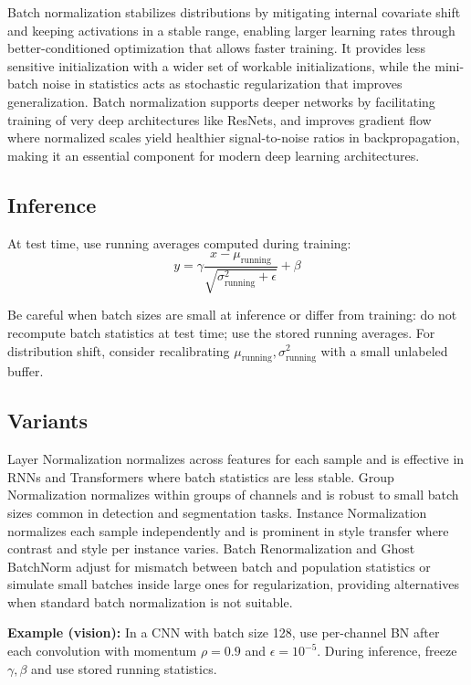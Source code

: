 Batch normalization stabilizes distributions by mitigating internal covariate shift and keeping activations in a stable range, enabling larger learning rates through better-conditioned optimization that allows faster training. It provides less sensitive initialization with a wider set of workable initializations, while the mini-batch noise in statistics acts as stochastic regularization that improves generalization. Batch normalization supports deeper networks by facilitating training of very deep architectures like ResNets, and improves gradient flow where normalized scales yield healthier signal-to-noise ratios in backpropagation, making it an essential component for modern deep learning architectures.

\subsection{Inference}

At test time, use running averages computed during training:
\begin{equation}
y = \gamma \frac{x - \mu_{\text{running}}}{\sqrt{\sigma^2_{\text{running}} + \epsilon}} + \beta
\end{equation}

Be careful when batch sizes are small at inference or differ from training: do not recompute batch statistics at test time; use the stored running averages. For distribution shift, consider recalibrating $\mu_{\text{running}}, \sigma^2_{\text{running}}$ with a small unlabeled buffer.

\subsection{Variants}

Layer Normalization normalizes across features for each sample and is effective in RNNs and Transformers where batch statistics are less stable. Group Normalization normalizes within groups of channels and is robust to small batch sizes common in detection and segmentation tasks. Instance Normalization normalizes each sample independently and is prominent in style transfer where contrast and style per instance varies. Batch Renormalization and Ghost BatchNorm adjust for mismatch between batch and population statistics or simulate small batches inside large ones for regularization, providing alternatives when standard batch normalization is not suitable.

\begin{example}
\textbf{Example (vision):} In a CNN with batch size 128, use per-channel BN after each convolution with momentum $\rho=0.9$ and $\epsilon=10^{-5}$. During inference, freeze $\gamma,\beta$ and use stored running statistics.
\end{example}


